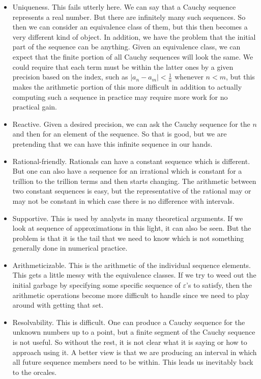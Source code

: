 \documentclass[12pt]{article}
\theoremstyle{remark}
\begin{document}
\begin{itemize}
    \item Uniqueness. This fails utterly here. We can say that a Cauchy sequence represents a real number. But there are infinitely many such sequences. So then we can consider an equivalence class of them, but this then becomes a very different kind of object. In addition, we have the problem that the initial part of the sequence can be anything. Given an equivalence class, we can expect that the finite portion of all Cauchy sequences will look the same. We could require that each term must be within the latter ones by a given precision based on the index, such as $|a_n - a_m| < \tfrac{1}{n}$ whenever $n < m$, but this makes the arithmetic portion of this more difficult in addition to actually computing such a sequence in practice may require more work for no practical gain. 
    \item Reactive. Given a desired precision, we can ask the Cauchy sequence for the $n$ and then for an element of the sequence. So that is good, but we are pretending that we can have this infinite sequence in our hands. 
    \item Rational-friendly. Rationals can have a constant sequence which is different. But one can also have a sequence for an irrational which is constant for a trillion to the trillion terms and then starts changing. The arithmetic between two constant sequences is easy, but the representative of the rational may or may not be constant in which case there is no difference with intervals.  
    \item Supportive. This is used by analysts in many theoretical arguments. If we look at sequence of approximations in this light, it can also be seen. But the problem is that it is the tail that we need to know which is not something generally done in numerical practice. 
    \item Arithmeticizable. This is the arithmetic of the individual sequence elements. This gets a little messy with the equivalence classes. If we try to weed out the initial garbage by specifying some specific sequence of $\varepsilon$'s to satisfy, then the arithmetic operations become more difficult to handle since we need to play around with getting that set. 
    \item Resolvability. This is difficult. One can produce a Cauchy sequence for the unknown numbers up to a point, but a finite segment of the Cauchy sequence is not useful. So without the rest, it is not clear what it is saying or how to approach using it. A better view is that we are producing an interval in which all future sequence members need to be within. This leads us inevitably back to the orcales. 
\end{itemize}
\end{document}
